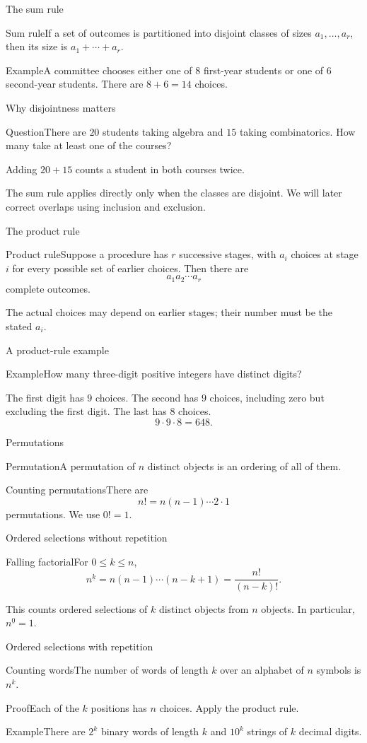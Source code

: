 \documentclass[aspectratio=169,11pt]{beamer}
\newcommand{\Def}[2]{\begin{block}{#1}#2\end{block}}
\newcommand{\Thm}[2]{\begin{block}{#1}#2\end{block}}
\renewcommand{\Proof}[1]{\begin{block}{Proof}\normalsize #1\end{block}}
\newcommand{\Question}[1]{\begin{block}{Question}#1\end{block}}
\renewcommand{\Example}[1]{\begin{block}{Example}#1\end{block}}
\newcommand{\fall}[2]{#1^{\underline{#2}}}
\newcommand{\gap}{\par\medskip}
\begin{document}
\begin{frame}{The sum rule}
\large
\Thm{Sum rule}{If a set of outcomes is partitioned into disjoint classes of sizes $a_1,\ldots,a_r$, then its size is $a_1+\cdots+a_r$.}
\Example{A committee chooses either one of $8$ first-year students or one of $6$ second-year students. There are $8+6=14$ choices.}
\end{frame}
\begin{frame}{Why disjointness matters}
\large
\Question{There are $20$ students taking algebra and $15$ taking combinatorics. How many take at least one of the courses?}
\gap Adding $20+15$ counts a student in both courses twice.
\gap The sum rule applies directly only when the classes are disjoint. We will later correct overlaps using inclusion and exclusion.
\end{frame}
\begin{frame}{The product rule}
\large
\Thm{Product rule}{Suppose a procedure has $r$ successive stages, with $a_i$ choices at stage $i$ for every possible set of earlier choices. Then there are
\[a_1a_2\cdots a_r\]
complete outcomes.}
\gap The actual choices may depend on earlier stages; their number must be the stated $a_i$.
\end{frame}
\begin{frame}{A product-rule example}
\large
\Example{How many three-digit positive integers have distinct digits?}
\gap The first digit has $9$ choices. The second has $9$ choices, including zero but excluding the first digit. The last has $8$ choices.
\[9\cdot9\cdot8=648.\]
\end{frame}
\begin{frame}{Permutations}
\large
\Def{Permutation}{A permutation of $n$ distinct objects is an ordering of all of them.}
\Thm{Counting permutations}{There are
\[n!=n(n-1)\cdots2\cdot1\]
permutations. We use $0!=1$.}
\end{frame}
\begin{frame}{Ordered selections without repetition}
\large
\Def{Falling factorial}{For $0\leq k\leq n$,
\[\fall{n}{k}=n(n-1)\cdots(n-k+1)=\frac{n!}{(n-k)!}.\]}
\gap This counts ordered selections of $k$ distinct objects from $n$ objects. In particular, $\fall{n}{0}=1$.
\end{frame}
\begin{frame}{Ordered selections with repetition}
\large
\Thm{Counting words}{The number of words of length $k$ over an alphabet of $n$ symbols is $n^k$.}
\Proof{Each of the $k$ positions has $n$ choices. Apply the product rule.}
\Example{There are $2^k$ binary words of length $k$ and $10^k$ strings of $k$ decimal digits.}
\end{frame}
\end{document}
